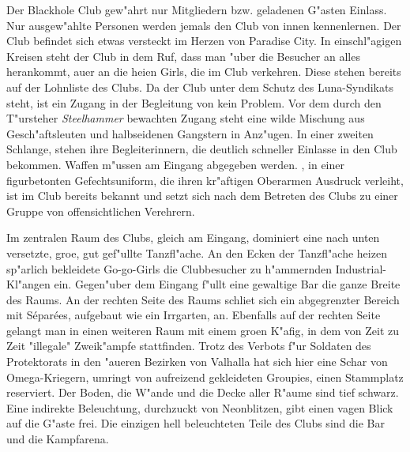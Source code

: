 
Der Blackhole Club gew"ahrt nur Mitgliedern bzw. geladenen G"asten Einlass. Nur ausgew"ahlte Personen werden jemals den Club von innen kennenlernen. Der Club befindet sich etwas versteckt im Herzen von Paradise City. In einschl"agigen Kreisen steht der Club in dem Ruf, dass man "uber die Besucher an alles herankommt, au\3er an die hei\3en Girls, die im Club verkehren. Diese stehen bereits auf der Lohnliste des Clubs. Da der Club unter dem Schutz des Luna-Syndikats steht, ist ein Zugang in der Begleitung von \xl{} kein Problem. Vor dem durch den T"ursteher \emph{Steelhammer} bewachten Zugang steht eine wilde Mischung aus Gesch"aftsleuten und halbseidenen Gangstern in Anz"ugen. In einer zweiten Schlange, stehen ihre Begleiterinnern, die deutlich schneller Einlasse in den Club bekommen. Waffen m"ussen am Eingang abgegeben werden. \xl{}, in einer figurbetonten Gefechtsuniform, die ihren kr"aftigen Oberarmen Ausdruck verleiht, ist im Club bereits bekannt und setzt sich nach dem Betreten des Clubs zu einer Gruppe von offensichtlichen Verehrern.

Im zentralen Raum des Clubs, gleich am Eingang, dominiert eine nach unten versetzte, gro\3e, gut gef"ullte Tanzfl"ache. An den Ecken der Tanzfl"ache heizen sp"arlich bekleidete Go-go-Girls die Clubbesucher zu h"ammernden Industrial-Kl"angen ein. Gegen"uber dem Eingang f"ullt eine gewaltige Bar die ganze Breite des Raums. An der rechten Seite des Raums schlie\3t sich ein abgegrenzter Bereich mit S\'epar\'ees, aufgebaut wie ein Irrgarten, an. Ebenfalls auf der rechten Seite gelangt man in einen weiteren Raum mit einem gro\3en K"afig, in dem von Zeit zu Zeit "illegale" Zweik"ampfe stattfinden. Trotz des Verbots f"ur Soldaten des Protektorats in den "au\3eren Bezirken von Valhalla hat sich hier eine Schar von Omega-Kriegern, umringt von aufreizend gekleideten Groupies, einen Stammplatz reserviert. Der Boden, die W"ande und die Decke aller R"aume sind tief schwarz. Eine indirekte Beleuchtung, durchzuckt von Neonblitzen, gibt einen vagen Blick auf die G"aste frei. Die einzigen hell beleuchteten Teile des Clubs sind die Bar und die Kampfarena.



